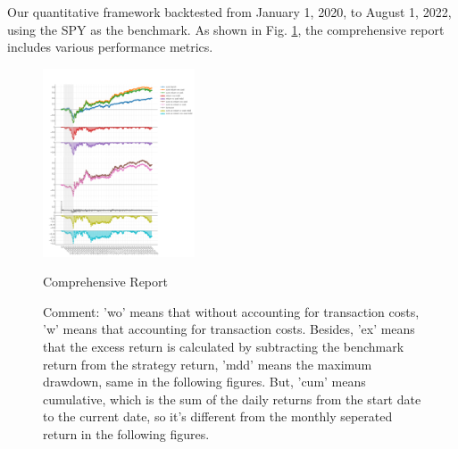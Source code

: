 \documentclass[conference]{IEEEtran}
\begin{document}
Our quantitative framework backtested from January 1, 2020, to August 1, 2022, using the SPY as the benchmark.
As shown in Fig. \ref{fig:comprehensive report}, the comprehensive report includes various performance metrics.

\begin{figure}[htbp]
\centering
    \includegraphics[width=0.4\textwidth]{plot_0.png}
    \caption{Comprehensive Report}
    \captionsetup{justification=raggedright, singlelinecheck=false}
    \caption*{\scriptsize Comment: 'wo' means that without accounting for transaction costs, 'w' means that accounting for transaction costs.
    Besides, 'ex' means that the excess return is calculated by subtracting the benchmark return from the strategy return, 'mdd' means the maximum drawdown, same in the following figures.
    But, 'cum' means cumulative, which is the sum of the daily returns from the start date to the current date, so it's different from the monthly seperated return in the following figures.}
    \label{fig:comprehensive report}
\end{figure}
\end{document}
